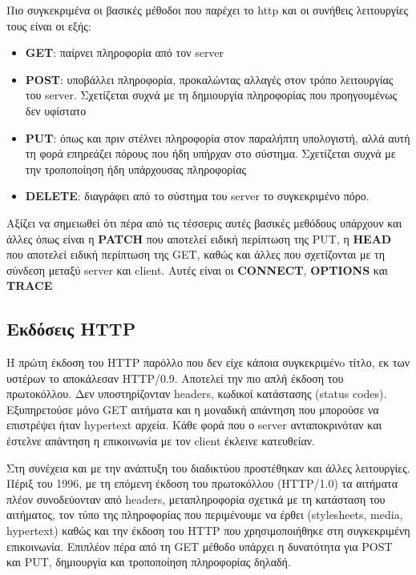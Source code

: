 Πιο συγκεκριμένα οι βασικές μέθοδοι που παρέχει το http και οι συνήθεις λειτουργίες τους είναι οι εξής:

\begin{itemize}
	\item \textbf{GET}: παίρνει πληροφορία από τον server
	\item \textbf{POST}: υποβάλλει πληροφορία, προκαλώντας αλλαγές στον τρόπο λειτουργίας του server. Σχετίζεται συχνά με τη δημιουργία πληροφορίας που προηγουμένως δεν υφίστατο 
	\item \textbf{PUT}: όπως και πριν στέλνει πληροφορία στον παραλήπτη υπολογιστή, αλλά αυτή τη φορά επηρεάζει πόρους που ήδη υπήρχαν στο σύστημα. Σχετίζεται συχνά με την τροποποίηση ήδη υπάρχουσας πληροφορίας
	\item \textbf{DELETE}: διαγράφει από το σύστημα του server το συγκεκριμένο πόρο.
\end{itemize}

Αξίζει να σημειωθεί ότι πέρα από τις τέσσερις αυτές βασικές μεθόδους υπάρχουν και άλλες όπως είναι 
η \textbf{PATCH} που αποτελεί ειδική περίπτωση της PUT, η \textbf{HEAD} που αποτελεί ειδική περίπτωση της GET,
καθώς και άλλες που σχετίζονται με τη σύνδεση μεταξύ server και client. Αυτές είναι οι \textbf{CONNECT}, \textbf{OPTIONS} και \textbf{TRACE} 

\subsection{Εκδόσεις HTTP}
\label{subsec:http_versions}

Η πρώτη έκδοση του HTTP παρόλλο που δεν είχε κάποια συγκεκριμένo τίτλο, εκ των υστέρων το αποκάλεσαν 
HTTP/0.9. Αποτελεί την πιο απλή έκδοση του πρωτοκόλλου. Δεν υποστηρίζονταν headers, κωδικοί κατάστασης (status codes).
Εξυπηρετούσε μόνο GET αιτήματα και η μοναδική απάντηση που μπορούσε να επιστρέψει ήταν hypertext αρχεία. Kάθε φορά που ο server ανταποκρινόταν και έστελνε
απάντηση η επικοινωνία με τον client έκλεινε κατευθείαν.

Στη συνέχεια και με την ανάπτυξη του διαδικτύου προστέθηκαν και άλλες λειτουργίες. Πέριξ του 1996,
με τη επόμενη έκδοση του πρωτοκόλλου (HTTP/1.0) τα αιτήματα πλέον συνοδεύονταν από headers, μεταπληροφορία σχετικά
με τη κατάσταση του αιτήματος, τον τύπο της πληροφορίας που περιμένουμε να έρθει (stylesheets, media, hypertext) καθώς και 
την έκδοση του HTTP που χρησιμοποιήθηκε στη συγκεκριμένη επικοινωνία. Επιπλέον πέρα από τη GET μέθοδο υπάρχει η
δυνατότητα για POST και PUT, δημιουργία και τροποποίηση πληροφορίας δηλαδή.

